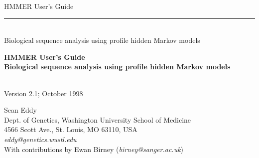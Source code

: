 \begin{titlepage}
{\Large

\vspace*{\fill}

\begin{latexonly}
\noindent
{\Huge \textsf{HMMER User's Guide}} \\ 
\rule[2pt]{\textwidth}{1pt} \\
\hspace*{\fill} {\large \textsf{Biological sequence analysis using
profile hidden Markov models} \\ }
\end{latexonly}

\begin{htmlonly}
\begin{center}
{\Huge \textbf{HMMER User's Guide}}\\
{\large \textbf{Biological sequence analysis using
profile hidden Markov models}}\\
\end{center}
\end{htmlonly}

\vspace*{\fill}

\begin{center}
\textsl{}\\
Version 2.1; October 1998 \\ 

\vspace*{\fill}

Sean Eddy\\
Dept. of Genetics, Washington University School of Medicine\\
4566 Scott Ave., St. Louis, MO 63110, USA\\
\textsl{eddy@genetics.wustl.edu} \\
With contributions by Ewan Birney (\textsl{birney@sanger.ac.uk})\\
\end{center}

\vspace*{\fill}

}
\end{titlepage}
